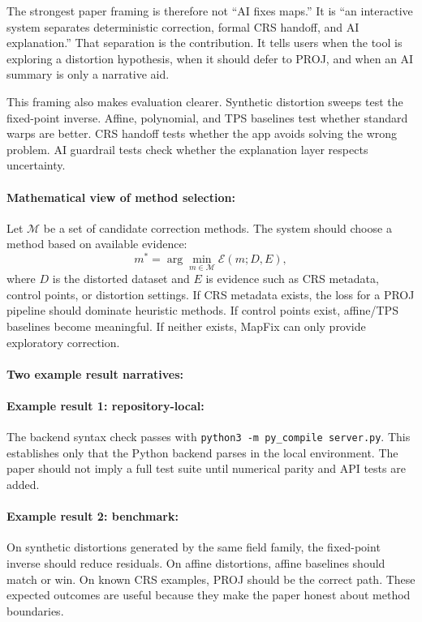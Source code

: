\documentclass{article}
\begin{document}
The strongest paper framing is therefore not ``AI fixes maps.'' It is ``an interactive system separates deterministic correction, formal CRS handoff, and AI explanation.'' That separation is the contribution. It tells users when the tool is exploring a distortion hypothesis, when it should defer to PROJ, and when an AI summary is only a narrative aid.

This framing also makes evaluation clearer. Synthetic distortion sweeps test the fixed-point inverse. Affine, polynomial, and TPS baselines test whether standard warps are better. CRS handoff tests whether the app avoids solving the wrong problem. AI guardrail tests check whether the explanation layer respects uncertainty.

\paragraph{Mathematical view of method selection:}

Let $\mathcal{M}$ be a set of candidate correction methods. The system should choose a method based on available evidence:
\begin{equation}
  m^*=\arg\min_{m\in\mathcal{M}} \mathcal{E}(m;D,E),
\end{equation}
where $D$ is the distorted dataset and $E$ is evidence such as CRS metadata, control points, or distortion settings. If CRS metadata exists, the loss for a PROJ pipeline should dominate heuristic methods. If control points exist, affine/TPS baselines become meaningful. If neither exists, MapFix can only provide exploratory correction.

\paragraph{Two example result narratives:}

\paragraph{Example result 1: repository-local:}
The backend syntax check passes with \texttt{python3 -m py\_compile server.py}. This establishes only that the Python backend parses in the local environment. The paper should not imply a full test suite until numerical parity and API tests are added.

\paragraph{Example result 2: benchmark:}
On synthetic distortions generated by the same field family, the fixed-point inverse should reduce residuals. On affine distortions, affine baselines should match or win. On known CRS examples, PROJ should be the correct path. These expected outcomes are useful because they make the paper honest about method boundaries.
\end{document}
